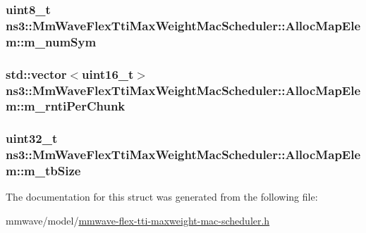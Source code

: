 \subsubsection[{\texorpdfstring{m\+\_\+num\+Sym}{m_numSym}}]{\setlength{\rightskip}{0pt plus 5cm}uint8\+\_\+t ns3\+::\+Mm\+Wave\+Flex\+Tti\+Max\+Weight\+Mac\+Scheduler\+::\+Alloc\+Map\+Elem\+::m\+\_\+num\+Sym}\hypertarget{structns3_1_1MmWaveFlexTtiMaxWeightMacScheduler_1_1AllocMapElem_a88caa6c209013a7853c442520d9771d1}{}\label{structns3_1_1MmWaveFlexTtiMaxWeightMacScheduler_1_1AllocMapElem_a88caa6c209013a7853c442520d9771d1}
\subsubsection[{\texorpdfstring{m\+\_\+rnti\+Per\+Chunk}{m_rntiPerChunk}}]{\setlength{\rightskip}{0pt plus 5cm}std\+::vector$<$uint16\+\_\+t$>$ ns3\+::\+Mm\+Wave\+Flex\+Tti\+Max\+Weight\+Mac\+Scheduler\+::\+Alloc\+Map\+Elem\+::m\+\_\+rnti\+Per\+Chunk}\hypertarget{structns3_1_1MmWaveFlexTtiMaxWeightMacScheduler_1_1AllocMapElem_a5d049ac84694957179c2a7a3ea65a55c}{}\label{structns3_1_1MmWaveFlexTtiMaxWeightMacScheduler_1_1AllocMapElem_a5d049ac84694957179c2a7a3ea65a55c}
\subsubsection[{\texorpdfstring{m\+\_\+tb\+Size}{m_tbSize}}]{\setlength{\rightskip}{0pt plus 5cm}uint32\+\_\+t ns3\+::\+Mm\+Wave\+Flex\+Tti\+Max\+Weight\+Mac\+Scheduler\+::\+Alloc\+Map\+Elem\+::m\+\_\+tb\+Size}\hypertarget{structns3_1_1MmWaveFlexTtiMaxWeightMacScheduler_1_1AllocMapElem_a1cdeb29a81cb759a17dcda74b10ca1bb}{}\label{structns3_1_1MmWaveFlexTtiMaxWeightMacScheduler_1_1AllocMapElem_a1cdeb29a81cb759a17dcda74b10ca1bb}


The documentation for this struct was generated from the following file\+:\begin{DoxyCompactItemize}
\item 
mmwave/model/\hyperlink{mmwave-flex-tti-maxweight-mac-scheduler_8h}{mmwave-\/flex-\/tti-\/maxweight-\/mac-\/scheduler.\+h}\end{DoxyCompactItemize}
